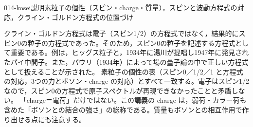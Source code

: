 \documentclass[uplatex,dvipdfmx,a4paper,11pt]{jsarticle}
\begin{document}
\begin{mondai}{014-kosei}{説明}{素粒子の個性（スピン・charge・質量），スピンと波動方程式の対応，クライン・ゴルドン方程式の位置づけ}
\begin{tadashii}
 クライン・ゴルドン方程式は電子（スピン1/2）の方程式ではなく，結果的にスピン0の粒子の方程式であった。そのため，スピン0の粒子を記述する方程式として重要である。例は，ヒッグス粒子と，1934年に湯川が提唱し1947年に発見されたパイ中間子。また，パウリ（1934年）によって場の量子論の中で正しい方程式として扱えることが示された。 %
\kenzan 素粒子の個性の表（スピン0／1/2／1 と方程式の対応，3つの力とボソン・charge の対応）とすべて一致する。電子はスピン1/2なので，スピン0の方程式で原子スペクトルが再現できなかったことと矛盾しない。
\tsumazuki 「charge＝電荷」だけではない。この講義の charge は，弱荷・カラー荷も含めた「ボソンとの結合の強さ」の総称である。質量もボソンとの相互作用で作り出せる点にも注意する。 %
\end{tadashii}
\end{mondai}

\noteowari
\end{document}
